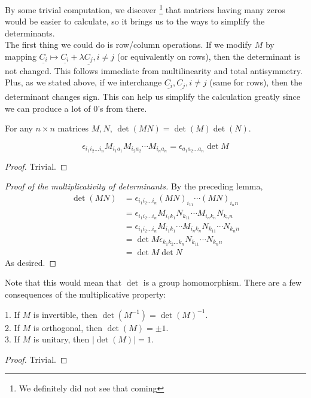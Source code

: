By some trivial computation, we discover
\footnote{We definitely did not see that coming}
that matrices having many zeros would be easier to calculate, so it brings us to the ways to simplify the determinants.\\
The first thing we could do is row/column operations.
If we modify $M$ by mapping $\underline{C_i}\mapsto \underline{C_i}+\lambda\underline{C_j}, i\neq j$ (or equivalently on rows), then the determinant is not changed.
This follows immediate from multilinearity and total antisymmetry.\\
Plus, as we stated above, if we interchange $\underline{C_i},\underline{C_j},i\neq j$ (same for rows), then the determinant changes sign.
This can help us simplify the calculation greatly since we can produce a lot of $0$'s from there.
\begin{theorem}
    For any $n\times n$ matrices $M,N$, $\det(MN)=\det(M)\det(N)$.
\end{theorem}
\begin{lemma}
    $$\epsilon_{i_1i_2\ldots i_n}M_{i_1a_1}M_{i_2a_2}\cdots M_{i_na_n}=\epsilon_{a_1a_2\ldots a_n}\det{M}$$
\end{lemma}
\begin{proof}
    Trivial.
\end{proof}
\begin{proof}[Proof of the multiplicativity of determinants]
    By the preceding lemma,
    \begin{align*}
        \det(MN)&=\epsilon_{i_1i_2\ldots i_n}(MN)_{i_11}\cdots(MN)_{i_nn}\\
        &=\epsilon_{i_1i_2\ldots i_n}M_{i_1k_1}N_{k_11}\cdots M_{i_nk_n}N_{k_nn}\\
        &=\epsilon_{i_1i_2\ldots i_n}M_{i_1k_1}\cdots M_{i_nk_n}N_{k_11}\cdots N_{k_nn}\\
        &=\det{M}\epsilon_{k_1k_2\ldots k_n}N_{k_11}\cdots N_{k_nn}\\
        &=\det{M}\det{N}
    \end{align*}
    As desired.
\end{proof}
Note that this would mean that $\det$ is a group homomorphism.
There are a few consequences of the multiplicative property:
\begin{proposition}
    1. If $M$ is invertible, then $\det(M^{-1})=\det(M)^{-1}$.\\
    2. If $M$ is orthogonal, then $\det(M)=\pm 1$.\\
    3. If $M$ is unitary, then $|\det(M)|=1$.
\end{proposition}
\begin{proof}
    Trivial.
\end{proof}
